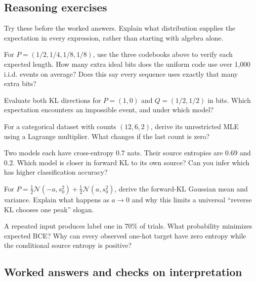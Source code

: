 \subsection{Reasoning exercises}
Try these before the worked answers. Explain what distribution supplies the
expectation in every expression, rather than starting with algebra alone.
\begin{exercise}
For $P=(1/2,1/4,1/8,1/8)$, use the three codebooks above to verify each expected
length. How many extra ideal bits does the uniform code use over 1,000 i.i.d.
events on average? Does this say every sequence uses exactly that many extra bits?
\end{exercise}
\begin{exercise}
Evaluate both KL directions for $P=(1,0)$ and $Q=(1/2,1/2)$ in bits.
Which expectation encounters an impossible event, and under which model?
\end{exercise}
\begin{exercise}
For a categorical dataset with counts $(12,6,2)$, derive its unrestricted MLE
using a Lagrange multiplier. What changes if the last count is zero?
\end{exercise}
\begin{exercise}
Two models each have cross-entropy $0.7$ nats. Their source entropies are $0.69$
and $0.2$. Which model is closer in forward KL to its own source? Can you infer
which has higher classification accuracy?
\end{exercise}
\begin{exercise}
For $P=\tfrac12\mathcal N(-a,s_0^2)+\tfrac12\mathcal N(a,s_0^2)$, derive the
forward-KL Gaussian mean and variance. Explain what happens as $a\to0$ and why
this limits a universal ``reverse KL chooses one peak'' slogan.
\end{exercise}
\begin{exercise}
A repeated input produces label one in $70\%$ of trials. What probability
minimizes expected BCE? Why can every observed one-hot target have zero entropy
while the conditional source entropy is positive?
\end{exercise}

\subsection{Worked answers and checks on interpretation}
